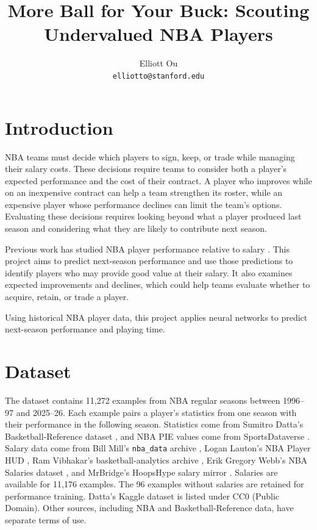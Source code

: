 \documentclass{article}
\title{More Ball for Your Buck: Scouting Undervalued NBA Players}
\author{Elliott Ou \\
  \texttt{elliotto@stanford.edu}}
\begin{document}
\maketitle

\section{Introduction}
NBA teams must decide which players to sign, keep, or trade while managing their
salary costs. These decisions require teams to consider both a player's expected
performance and the cost of their contract. A player who improves while on an
inexpensive contract can help a team strengthen its roster, while an expensive
player whose performance declines can limit the team's options. Evaluating these
decisions requires looking beyond what a player produced last season and
considering what they are likely to contribute next season.

Previous work has studied NBA player performance relative to salary
\cite{lautier2023}. This project aims to predict next-season performance and use
those predictions to identify players who may provide good value at their salary.
It also examines expected improvements and declines, which could help teams
evaluate whether to acquire, retain, or trade a player.

Using historical NBA player data, this project applies neural networks to
predict next-season performance and playing time.

\section{Dataset}
The dataset contains 11,272 examples from NBA regular seasons between 1996--97 and
2025--26. Each example pairs a player's statistics from one season with their
performance in the following season. Statistics come from Sumitro Datta's
Basketball-Reference dataset \cite{datta2026}, and NBA PIE values come from
SportsDataverse \cite{sportsdataverse2026}. Salary data come from Bill Mill's
\texttt{nba\_data} archive \cite{mill2026}, Logan Lauton's NBA Player HUD
\cite{lauton2026}, Ram Vibhakar's basketball-analytics archive
\cite{vibhakar2026}, Erik Gregory Webb's NBA Salaries dataset \cite{webb2026},
and MrBridge's HoopsHype salary mirror \cite{mrbridge2026}. Salaries are available
for 11,176 examples. The 96 examples without salaries are retained for
performance training. Datta's Kaggle dataset is listed under CC0 (Public Domain).
Other sources, including NBA and Basketball-Reference data, have separate terms
of use.
\end{document}
